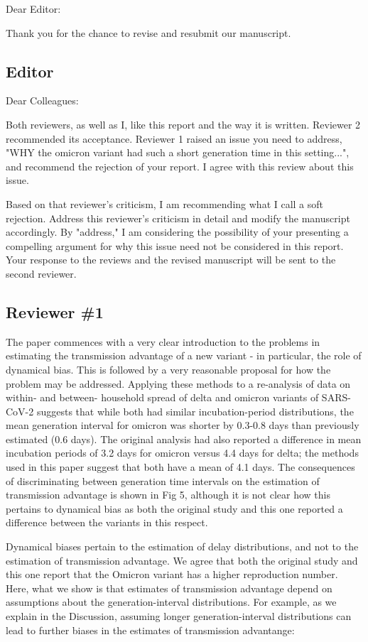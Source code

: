 \documentclass[12pt]{article}
\newcommand{\rev}{\subsection*}
\newcommand{\revtext}{\textsf}
\begin{document}
\noindent Dear Editor:

Thank you for the chance to revise and resubmit our manuscript. 

\rev{Editor}

\revtext{Dear Colleagues:}

\revtext{Both reviewers, as well as I, like this report and the way it is written. Reviewer 2 recommended its acceptance. Reviewer 1 raised an issue you need to address, "WHY the omicron variant had such a short generation time in this setting...", and 
recommend the rejection of your report. I agree with this review about this issue.}

\revtext{Based on that reviewer's criticism, I am recommending what I call a soft rejection. Address this reviewer's criticism in detail and modify the manuscript accordingly. By "address," I am considering the possibility of your presenting a compelling argument for why this issue need not be considered in this report. Your response to the reviews and the revised manuscript will be sent to the second reviewer.}

\rev{Reviewer \#1}

\revtext{The paper commences with a very clear introduction to the problems in estimating the transmission advantage of a new variant - in particular, the role of dynamical bias. This is followed by a very reasonable proposal for how the problem may be addressed. Applying these methods to a re-analysis of data on within- and between- household spread of delta and omicron variants of SARS-CoV-2 suggests that while both had similar incubation-period distributions, the mean generation interval for omicron was shorter by 0.3-0.8 days than previously estimated (0.6 days). The original analysis had also reported a difference in mean incubation periods of 3.2 days for omicron versus 4.4 days for delta; the methods used in this paper suggest that both have a mean of 4.1 days. The consequences of discriminating between generation time intervals on the estimation of transmission advantage is shown in Fig 5, although it is not clear how this pertains to dynamical bias as both the original study and this one reported a difference between the variants in this respect.}

Dynamical biases pertain to the estimation of delay distributions, and not to the estimation of transmission advantage. 
We agree that both the original study and this one report that the Omicron variant has a higher reproduction number. 
Here, what we show is that estimates of transmission advantage depend on assumptions about the generation-interval distributions. 
For example, as we explain in the Discussion, assuming longer generation-interval distributions can lead to further biases in the estimates of transmission advantange:
\end{document}
